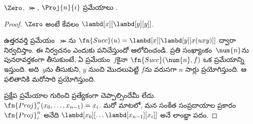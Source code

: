 \documentclass[../../../include/open-logic-section]{subfiles}
\begin{document}

\begin{lem}
$\Zero$, $\Succ$, $\Proj{n}{i}$ ప్రమేయాలు .
\end{lem}

\begin{proof}
$\Zero$ అంటే కేవలం
$\lambd[x][\lambd[y][y]]$.

ఉత్తరవర్తి ప్రమేయం~$\Succ$ను
$\fn{Succ}(u) = \lambd[x][\lambd[y][x(uxy)]]$ ద్వారా నిర్వచిస్తాం.
ఈ నిర్వచనం ఎందుకు పనిచేస్తుందో ఆలోచించండి. ప్రతి సంఖ్యాంకం~$\num{n}$ను
పునరావర్తకంగా తీసుకుంటే, ఏ ప్రమేయం~$f$కైనా $\fn{Succ}(\num{n},f)$ ఒక ప్రమేయాన్ని ఇస్తుంది.
అది~$y$ను తీసుకుని, $y$ నుంచి మొదలుపెట్టి $f$ను వరుసగా
$n$ సార్లు ప్రయోగిస్తుంది. ఆ ఫలితానికి మరోసారి ప్రయోగిస్తుంది.

ప్రక్షేప ప్రమేయాల గురించి ప్రత్యేకంగా చెప్పాల్సిందేమీ లేదు. $\fn{Proj}^n_i(x_0, \dots,
x_{n-1}) = x_i$. మరో మాటలో, మన సంకేత సంప్రదాయాల ప్రకారం
$\fn{Proj}^n_i$ అనేది $\lambd[x_0][\dots \lambd[x_{n-1}][x_i]]$
అనే లాంబ్డా పదం.
\end{proof}
\end{document}
